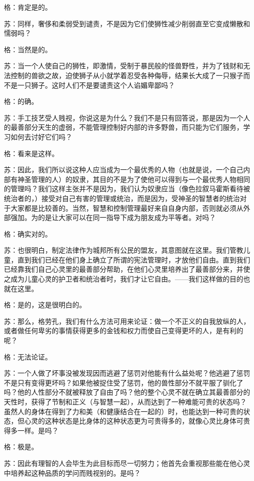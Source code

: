 \documentclass[12pt,oneside]{book}
\begin{document}
格：肯定是的。

苏：同样，奢侈和柔弱受到谴责，不是因为它们使狮性减少削弱直至它变成懒散和懦弱吗？

格：当然是的。

苏：当一个人使自己的狮性，即激情，受制于暴民般的怪兽野性，并为了钱财和无法控制的兽欲之故，迫使狮子从小就学着忍受各种侮辱，结果长大成了一只猴子而不是一只狮子。这时人们不是要谴责这个人谄媚卑鄙吗？

格：的确。

苏：手工技艺受人贱视，你说这是为什么？我们不是只有回答说，那是因为一个人的最善部分天生的虚弱，不能管理控制好内部的许多野兽，而只能为它们服务，学习如何去讨好它们吗？

格：看来是这样。

苏：因此，我们所以说这种人应当成为一个最优秀的人物（也就是说，一个自己内部有神圣管理的人）的奴隶，其目的不是为了使他可以得到与一个最优秀人物相同的管理吗？我们这样主张并不是因为，我们认为奴隶应当（像色拉叙马霍斯看待被统治者的，）接受对自己有害的管理或统治，而是因为，受神圣的智慧者的统治对于大家都是比较善的。当然，智慧和控制管理最好来自自身内部，否则就必须从外部强加。为的是让大家可以在同一指导下成为朋友成为平等者。对吗？

格：确实对的。

苏：也很明白，制定法律作为城邦所有公民的盟友，其意图就在这里。我们管教儿童，直到我们已经在他们身上确立了所谓的宪法管理时，才放他们自由。直到我们已经靠我们自己心灵里的最善部分帮助，在他们心灵里培养出了最善部分来，并使之成为儿童心灵的护卫者和统治者时，我们才让它自由。——我们这样做的目的也就在这里。

格：是的，这是很明白的。

苏：那么，格劳孔，我们有什么方法可用来论证：做一个不正义的自我放纵的人，或者做任何卑劣的事情获得更多的金钱和权力而使自己变得更坏的人，是有利的呢？

格：无法论证。

苏：一个人做了坏事没被发现因而逃避了惩罚对他能有什么益处呢？他逃避了惩罚不是只有变得更坏吗？如果他被捉住受了惩罚，他的兽性部分不就平服了驯化了吗？他的人性部分不就被释放了自由了吗？他的整个心灵不就在确立其最善部分的天性时，获得了节制和正义（与智慧一起），从而达到了一种难能可贵的状态吗？虽然人的身体在得到了力和美（和健康结合在一起的）时，也能达到一种可贵的状态，但心灵的这种状态是比身体的这种状态更为可贵得多的，就像心灵比身体可贵得多一样。是吗？

格：极是。

苏：因此有理智的人会毕生为此目标而尽一切努力；他首先会重视那些能在他心灵中培养起这种品质的学问而贱视别的。是吗？
\end{document}
